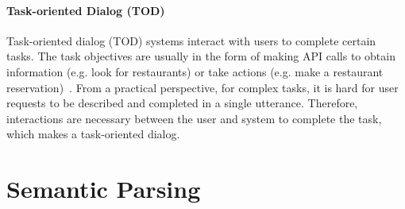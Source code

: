 \documentclass[11pt,dvipdfm]{article}
\begin{document}


\paragraph{Task-oriented Dialog (TOD)}
Task-oriented dialog (TOD) systems interact with users to complete certain tasks. The task objectives are usually in the form of making API calls to obtain information (e.g. look for restaurants) or take actions (e.g. make a restaurant reservation)~\cite{bAbIDialog,airdialogue,DSTC2,multiwoz}. From a practical perspective, for complex tasks, it is hard for user requests to be described and completed in a single utterance. Therefore, interactions are necessary between the user and system to complete the task, which makes a task-oriented dialog. 



\section{Semantic Parsing}
\end{document}
